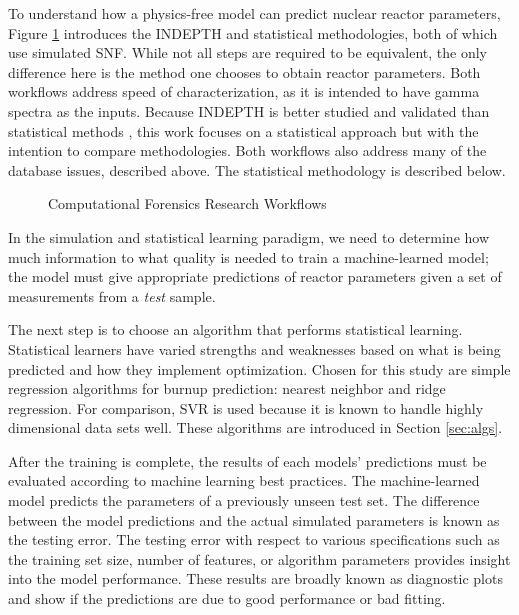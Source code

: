 To understand how a physics-free model can predict nuclear reactor parameters,
Figure \ref{fig:compworkflow} introduces the \gls{INDEPTH} and statistical
methodologies, both of which use simulated \gls{SNF}.  While not all steps are
required to be equivalent, the only difference here is the method one chooses
to obtain reactor parameters. Both workflows address speed of characterization,
as it is intended to have gamma spectra as the inputs.  Because \gls{INDEPTH}
is better studied and validated than statistical methods \cite{weber_2006,
weber_2011, weber_2010}, this work focuses on a statistical approach but with
the intention to compare methodologies.  Both workflows also address many of
the database issues, described above. The statistical methodology is described
below.
\\
\begin{figure}[!tbh]
  \caption{Computational Forensics Research Workflows}
  \label{fig:compworkflow}
\end{figure}

In the simulation and statistical learning paradigm, we need to determine how
much information to what quality is needed to train a machine-learned model;
the model must give appropriate predictions of reactor parameters given a set
of measurements from a \textit{test} sample. 

The next step is to choose an algorithm that performs statistical learning.
Statistical learners have varied strengths and weaknesses based on what is
being predicted and how they implement optimization.  Chosen for this study are
simple regression algorithms for burnup prediction: nearest neighbor and ridge
regression.  For comparison, \acrfull{SVR} is used because it is known to handle
highly dimensional data sets well.  These algorithms are introduced in Section
\ref{sec:algs}.

After the training is complete, the results of each models' predictions must be
evaluated according to machine learning best practices.  The machine-learned
model predicts the parameters of a previously unseen test set.  The difference
between the model predictions and the actual simulated parameters is known as
the testing error.  The testing error with respect to various specifications
such as the training set size, number of features, or algorithm parameters
provides insight into the model performance. These results are broadly known as
diagnostic plots and show if the predictions are due to good performance or bad
fitting. 


